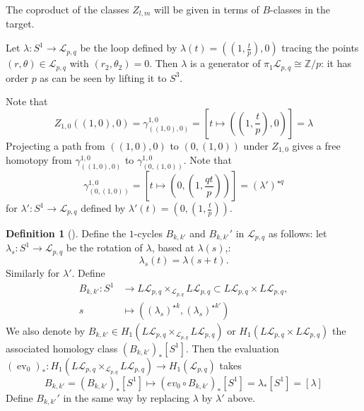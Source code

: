 \documentclass[reqno]{amsart}
\theoremstyle{definition}
\newtheorem{definition}[theorem]{Definition}
\theoremstyle{remark}
\DeclareMathOperator{\ev}{ev}
\begin{document}
The coproduct of the classes
$Z_{l,m}$ will be given in terms of $B$-classes in the
target.


Let $\lambda \colon S^{1} \to \mathcal{L}_{p,q}$ be the
loop defined by $\lambda(t) = \left( (1, \frac{t}{p}),
0
\right) $ tracing the points $(r,\theta) \in \mathcal{L}_{p,q}$ 
with $\left( r_2, \theta_2 \right) = 0$. Then
$\lambda$ is a generator of
$\pi_1 \mathcal{L}_{p,q} \cong \mathbb{Z} / p$:
it has order $p$ as can be seen by lifting it to $S^3$.
\todo{}

Note that
\[
    Z_{1,0}\left( (1,0), 0 \right) =
    \gamma_{\left( (1,0), 0 \right) }^{1,0} = 
    \left[ t \mapsto \left( (1, \frac{t}{p}), 0  \right)  \right] = 
    \lambda
\] 
Projecting a path
from $\left( \left( 1,0 \right) , 0 \right) $ to
$\left( 0, (1,0) \right) $ under
$Z_{1,0}$ gives a free homotopy
from
$\gamma_{\left( (1,0),0 \right) }^{1,0}$ to
$\gamma_{\left( 0, (1,0) \right) }^{1,0}$. Note that
\[
\gamma_{\left( 0, (1,0) \right) }^{1,0} = 
\left[ t \mapsto \left( 0, (1, \frac{qt}{p}) \right)  \right] 
= ( \lambda' )^{\star q}
\] 
for $\lambda' \colon S^{1} \to \mathcal{L}_{p,q}$ defined
by $\lambda' (t) = \left( 0, (1, \frac{t}{p}) \right) $.

\begin{definition}[]
    Define the $1$-cycles $B_{k,k'}$ and
    $B_{k,k'}'$ in
    $\mathcal{L}_{p,q}$ as follows:
    let $\lambda_s \colon S^{1} \to \mathcal{L}_{p,q}$ be the
    rotation of $\lambda$, based at $\lambda(s)$,:
    \[
    \lambda_s (t) = \lambda (s+t).
    \] 
    Similarly for $\lambda'$.
    Define
    \begin{align*}
        B_{k,k'} \colon S^{1} 
        &\to L \mathcal{L}_{p,q} \times_{\mathcal{L}_{p,q}}
        L \mathcal{L}_{p,q} \subset L \mathcal{L}_{p,q} \times 
        L \mathcal{L}_{p,q},\\
        s 
        &\mapsto \left( (\lambda_s)^{\star k},
        (\lambda_s)^{\star k' }\right) 
    \end{align*}
    We also denote by
    $B_{k,k'} \in H_1 \left( L \mathcal{L}_{p,q}
    \times_{\mathcal{L}_{p,q}} L \mathcal{L}_{p,q} \right) $ 
    or $H_1 \left( L \mathcal{L}_{p,q} \times L \mathcal{L}_{p,q} \right) $ 
    the associated homology class
    $\left( B_{k,k'} \right)_* \left[ S^{1} \right] $.
    Then the evaluation $\left( \ev_0 \right)_* \colon
    H_1 \left( L \mathcal{L}_{p,q} \times_{\mathcal{L}_{p,q}}
    L \mathcal{L}_{p,q}\right) \to 
    H_1 \left( \mathcal{L}_{p,q} \right) $ takes
     \[
     B_{k,k'} = \left( B_{k,k'} \right)_* \left[ S^{1} \right] 
     \mapsto \left( ev_0 \circ B_{k,k'} \right)_* \left[ S^{1} \right] 
     = \lambda_* \left[ S^{1} \right] = 
     \left[ \lambda \right] 
     \] 
     Define $B_{k,k'}'$ in the same way by
     replacing $\lambda$ by $\lambda'$ above.
\end{definition}
\end{document}
